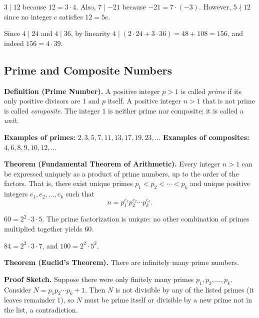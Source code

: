\documentclass[11pt,a4paper]{article}
\begin{document}
\begin{example}
$3 \mid 12$ because $12 = 3 \cdot 4$. Also, $7 \mid -21$ because $-21 = 7 \cdot (-3)$. However, $5 \nmid 12$ since no integer $c$ satisfies $12 = 5c$.
\end{example}

\begin{example}
Since $4 \mid 24$ and $4 \mid 36$, by linearity $4 \mid (2 \cdot 24 + 3 \cdot 36) = 48 + 108 = 156$, and indeed $156 = 4 \cdot 39$.
\end{example}

\subsection{Prime and Composite Numbers}

\textbf{Definition (Prime Number).} A positive integer $p > 1$ is called \textit{prime} if its only positive divisors are $1$ and $p$ itself. A positive integer $n > 1$ that is not prime is called \textit{composite}. The integer $1$ is neither prime nor composite; it is called a \textit{unit}.

\textbf{Examples of primes:} $2, 3, 5, 7, 11, 13, 17, 19, 23, \dots$
\textbf{Examples of composites:} $4, 6, 8, 9, 10, 12, \dots$

\textbf{Theorem (Fundamental Theorem of Arithmetic).} Every integer $n > 1$ can be expressed uniquely as a product of prime numbers, up to the order of the factors. That is, there exist unique primes $p_1 < p_2 < \cdots < p_k$ and unique positive integers $e_1, e_2, \dots, e_k$ such that
\begin{equation*}
    n = p_1^{e_1} p_2^{e_2} \cdots p_k^{e_k}.
\end{equation*}

\begin{example}
$60 = 2^2 \cdot 3 \cdot 5$. The prime factorization is unique: no other combination of primes multiplied together yields $60$.
\end{example}

\begin{example}
$84 = 2^2 \cdot 3 \cdot 7$, and $100 = 2^2 \cdot 5^2$.
\end{example}

\textbf{Theorem (Euclid's Theorem).} There are infinitely many prime numbers.

\textbf{Proof Sketch.} Suppose there were only finitely many primes $p_1, p_2, \dots, p_k$. Consider $N = p_1 p_2 \cdots p_k + 1$. Then $N$ is not divisible by any of the listed primes (it leaves remainder $1$), so $N$ must be prime itself or divisible by a new prime not in the list, a contradiction.
\end{document}
